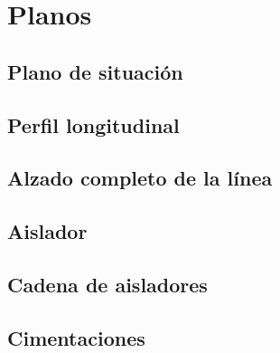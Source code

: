 \chapter{Planos}
\label{ch:plano}
\clearpage
\section{Plano de situación}
\label{sec:plano-situación}

\section{Perfil longitudinal}
\label{sec:plano-longitudinal}

\section{Alzado completo de la línea}
\label{sec:plano-alzado}





\section{Aislador}
\label{sec:plano-aislador}

\section{Cadena de aisladores}
\label{sec:plano-cadenas}



\section{Cimentaciones}
\label{sec:plano-cimentaciones}






